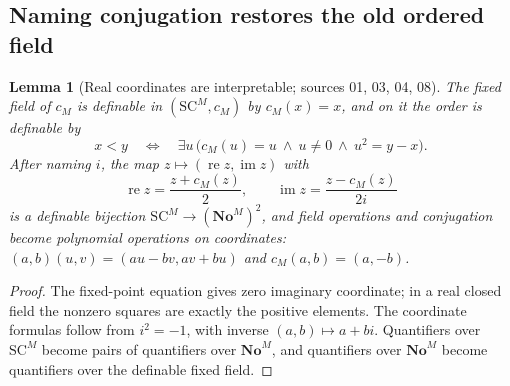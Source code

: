 \documentclass[11pt,letterpaper]{article}
\numberwithin{equation}{section}
\newtheorem{lemma}[lemma]{Lemma}
\theoremstyle{definition}
\theoremstyle{remark}
\newcommand{\No}{\mathbf{No}}
\newcommand{\SC}{\mathrm{SC}}
\newcommand{\NoM}{\No^{M}}
\newcommand{\SCM}{\SC^{M}}
\begin{document}
\subsection{Naming conjugation restores the old ordered field}

\begin{lemma}[Real coordinates are interpretable; sources 01, 03, 04, 08]\label{univ:lem:coordinates}
The fixed field of $c_M$ is definable in $(\SCM,c_M)$ by $c_M(x)=x$, and on it
the order is definable by
\begin{equation}\label{univ:eq:orderdef}
 x<y\quad\Longleftrightarrow\quad
 \exists u\,\bigl(c_M(u)=u\ \wedge\ u\ne0\ \wedge\ u^2=y-x\bigr).
\end{equation}
After naming $i$, the map $z\mapsto(\operatorname{re}z,\operatorname{im}z)$ with
\begin{equation}\label{univ:eq:coordinates}
 \operatorname{re}z=\frac{z+c_M(z)}2,\qquad
 \operatorname{im}z=\frac{z-c_M(z)}{2i}
\end{equation}
is a definable bijection $\SCM\to(\NoM)^2$, and field operations and
conjugation become polynomial operations on coordinates:
$(a,b)(u,v)=(au-bv,av+bu)$ and $c_M(a,b)=(a,-b)$.
\end{lemma}
\begin{proof}
The fixed-point equation gives zero imaginary coordinate; in a real closed
field the nonzero squares are exactly the positive elements. The coordinate
formulas follow from $i^2=-1$, with inverse $(a,b)\mapsto a+bi$. Quantifiers
over $\SCM$ become pairs of quantifiers over $\NoM$, and quantifiers over $\NoM$
become quantifiers over the definable fixed field.
\end{proof}
\end{document}
